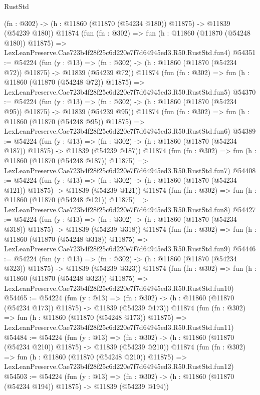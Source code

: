 \begin{lexlean}{RustStd}
\begin{coremodule}
    (fn : @302) -> (h : @11860 (@11870 (@54234 @180)) @11875) -> @11839 (@54239 @180))
    @11874
    (fun (fn : @302) =>
    fun (h : @11860 (@11870 (@54248 @180)) @11875) =>
    LexLeanPreserve.Cae723b4f28f25c6d220e7f7d64945ed3.R50.RustStd.fun4)
@54351 := @54224
    (fun (y : @13) =>
    (fn : @302) -> (h : @11860 (@11870 (@54234 @72)) @11875) -> @11839 (@54239 @72))
    @11874
    (fun (fn : @302) =>
    fun (h : @11860 (@11870 (@54248 @72)) @11875) =>
    LexLeanPreserve.Cae723b4f28f25c6d220e7f7d64945ed3.R50.RustStd.fun5)
@54370 := @54224
    (fun (y : @13) =>
    (fn : @302) -> (h : @11860 (@11870 (@54234 @95)) @11875) -> @11839 (@54239 @95))
    @11874
    (fun (fn : @302) =>
    fun (h : @11860 (@11870 (@54248 @95)) @11875) =>
    LexLeanPreserve.Cae723b4f28f25c6d220e7f7d64945ed3.R50.RustStd.fun6)
@54389 := @54224
    (fun (y : @13) =>
    (fn : @302) -> (h : @11860 (@11870 (@54234 @187)) @11875) -> @11839 (@54239 @187))
    @11874
    (fun (fn : @302) =>
    fun (h : @11860 (@11870 (@54248 @187)) @11875) =>
    LexLeanPreserve.Cae723b4f28f25c6d220e7f7d64945ed3.R50.RustStd.fun7)
@54408 := @54224
    (fun (y : @13) =>
    (fn : @302) -> (h : @11860 (@11870 (@54234 @121)) @11875) -> @11839 (@54239 @121))
    @11874
    (fun (fn : @302) =>
    fun (h : @11860 (@11870 (@54248 @121)) @11875) =>
    LexLeanPreserve.Cae723b4f28f25c6d220e7f7d64945ed3.R50.RustStd.fun8)
@54427 := @54224
    (fun (y : @13) =>
    (fn : @302) -> (h : @11860 (@11870 (@54234 @318)) @11875) -> @11839 (@54239 @318))
    @11874
    (fun (fn : @302) =>
    fun (h : @11860 (@11870 (@54248 @318)) @11875) =>
    LexLeanPreserve.Cae723b4f28f25c6d220e7f7d64945ed3.R50.RustStd.fun9)
@54446 := @54224
    (fun (y : @13) =>
    (fn : @302) -> (h : @11860 (@11870 (@54234 @323)) @11875) -> @11839 (@54239 @323))
    @11874
    (fun (fn : @302) =>
    fun (h : @11860 (@11870 (@54248 @323)) @11875) =>
    LexLeanPreserve.Cae723b4f28f25c6d220e7f7d64945ed3.R50.RustStd.fun10)
@54465 := @54224
    (fun (y : @13) =>
    (fn : @302) -> (h : @11860 (@11870 (@54234 @173)) @11875) -> @11839 (@54239 @173))
    @11874
    (fun (fn : @302) =>
    fun (h : @11860 (@11870 (@54248 @173)) @11875) =>
    LexLeanPreserve.Cae723b4f28f25c6d220e7f7d64945ed3.R50.RustStd.fun11)
@54484 := @54224
    (fun (y : @13) =>
    (fn : @302) -> (h : @11860 (@11870 (@54234 @210)) @11875) -> @11839 (@54239 @210))
    @11874
    (fun (fn : @302) =>
    fun (h : @11860 (@11870 (@54248 @210)) @11875) =>
    LexLeanPreserve.Cae723b4f28f25c6d220e7f7d64945ed3.R50.RustStd.fun12)
@54503 := @54224
    (fun (y : @13) =>
    (fn : @302) -> (h : @11860 (@11870 (@54234 @194)) @11875) -> @11839 (@54239 @194))

\end{coremodule}
\end{lexlean}
